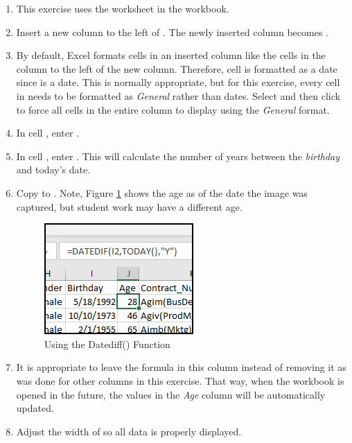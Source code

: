 \begin{enumerate}
	\item This exercise uses the  worksheet in the  workbook.
	\item Insert a new column to the left of . The newly inserted column becomes .
	\item By default, Excel formats cells in an inserted column like the cells in the column to the left of the new column. Therefore, cell  is formatted as a date since  is a date. This is normally appropriate, but for this exercise, every cell in  needs to be formatted as \textit{General} rather than dates. Select  and then click  to force all cells in the entire column to display using the \textit{General} format.
	\item In cell , enter .
	\item In cell , enter . This will calculate the number of years between the \textit{birthday} and today's date. 
	\item Copy  to . Note, Figure \ref{09:fig46} shows the age as of the date the image was captured, but student work may have a different age.
	
	\begin{figure}[H]
		\centering
		\includegraphics[width=\maxwidth{.50\linewidth}]{gfx/ch09_fig46}
		\caption{Using the Datediff() Function}
		\label{09:fig46}
	\end{figure}
	
	\item It is appropriate to leave the formula in this column instead of removing it as was done for other columns in this exercise. That way, when the workbook is opened in the future, the values in the \textit{Age} column will be automatically updated.
	\item Adjust the width of  so all data is properly displayed.
\end{enumerate}

